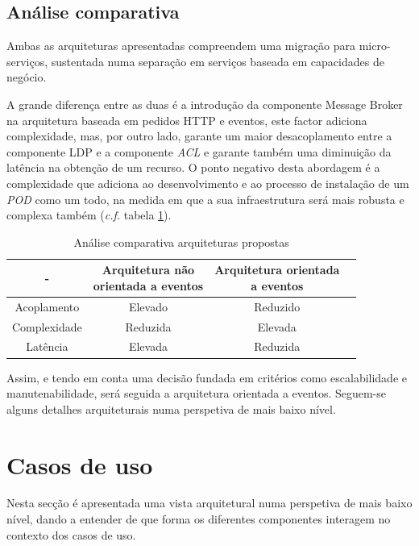 \subsection{Análise comparativa \label{conclusão_arquitetura}}
Ambas as arquiteturas apresentadas compreendem uma migração para micro-serviços, sustentada numa separação em serviços baseada em capacidades de negócio.

A grande diferença entre as duas é a introdução da componente Message Broker na arquitetura baseada em pedidos HTTP e eventos, este factor adiciona complexidade, mas, por outro lado, garante um maior desacoplamento entre a componente \acrshort{LDP} e a componente \emph{\acrshort{ACL}} e garante também uma diminuição da latência na obtenção de um recurso. O ponto negativo desta abordagem é a complexidade que adiciona ao desenvolvimento e ao processo de instalação de um \emph{\acrshort{POD}} como um todo, na medida em que a sua infraestrutura será mais robusta e complexa também (\emph{c.f.} tabela \ref{table_comparacao_arquiteturas}).

\begin{table}[h]
\centering
\caption{Análise comparativa arquiteturas propostas}
\vspace{0.5cm}
\label{table_comparacao_arquiteturas}
\begin{tabular}{c|c|c|c} 
- & \specialcell{Arquitetura não\\orientada a eventos}  &\specialcell{Arquitetura orientada\\a eventos} \\
\hline                          
Acoplamento & Elevado & Reduzido \\
Complexidade & Reduzida & Elevada \\
Latência & Elevada & Reduzida \\
\end{tabular}
\end{table}

Assim, e tendo em conta uma decisão fundada em critérios como escalabilidade e manutenabilidade, será seguida a arquitetura orientada a eventos. Seguem-se alguns detalhes arquiteturais numa perspetiva de mais baixo nível.

\section{Casos de uso \label{section_casos_de_uso}}
Nesta secção é apresentada uma vista arquitetural numa perspetiva de mais baixo nível, dando a entender de que forma os diferentes componentes interagem no contexto dos casos de uso.

